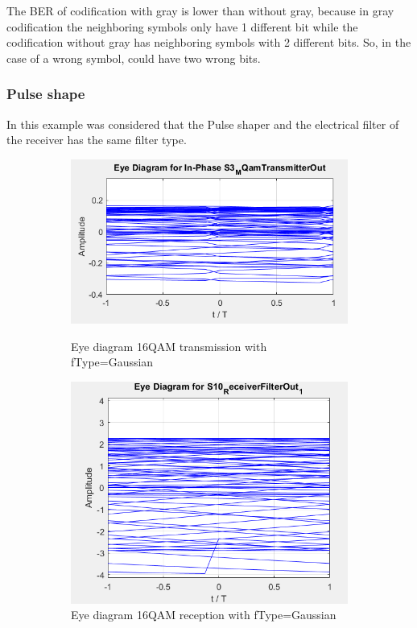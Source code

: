 The BER of codification with gray is lower than without gray, because in gray codification the neighboring symbols only have 1 different bit while the codification without gray has neighboring symbols with 2 different bits. So, in the case of a wrong symbol, could have two wrong bits.

 \subsubsection*{Pulse shape}
 In this example was considered that the Pulse shaper and the electrical filter of the receiver has the same filter type.
 \begin{figure}[H]
	\centering
        \begin{subfigure}{.55\textwidth}
        \centering
        	\includegraphics[scale=0.55]{./lib/m_qam_transmitter/figure_PLoureiro/16QAM_Gaussian_in.png}
        \label{Example_Gaussian_in}\caption{Eye diagram 16QAM transmission with fType=Gaussian }
        \end{subfigure}%
        \begin{subfigure}{.55\textwidth}
        \centering
        	\includegraphics[scale=0.45]{./lib/m_qam_transmitter/figure_PLoureiro/16QAM_Gaussian_out.png}
        	\caption{Eye diagram 16QAM reception with fType=Gaussian }\label{Example_Gaussian_out}
        \end{subfigure}
        \caption{}\label{Gaussian}
\end{figure}

